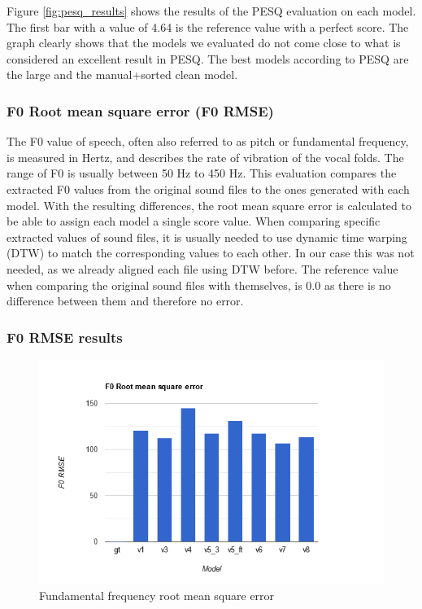 \documentclass[a4paper]{article}
\begin{document}
	Figure \ref{fig:pesq_results} shows the results of the PESQ evaluation on each
	model. The first bar with a value of 4.64 is the reference value with a perfect
	score. The graph clearly shows that the models we evaluated do not come close to
	what is considered an excellent result in PESQ. The best models according to
	PESQ are the large and the manual+sorted clean model.
	
	\subsubsection{F0 Root mean square error (F0 RMSE)}
	The F0 value of speech, often also referred to as pitch or fundamental
	frequency, is measured in Hertz, and describes the rate of vibration of the
	vocal folds. The range of F0 is usually between 50 Hz to 450 Hz. This evaluation
	compares the extracted F0 values from the original sound files to the ones
	generated with each model. With the resulting differences, the root mean square
	error is calculated to be able to assign each model a single score value. When
	comparing specific extracted values of sound files, it is usually needed to use
	dynamic time warping (DTW) to match the corresponding values to each other. In
	our case this was not needed, as we already aligned each file using DTW before.
	The reference value when comparing the original sound files with themselves, is
	0.0 as there is no difference between them and therefore no error.
	
	\subsubsection{F0 RMSE results}
	\begin{figure}[hbtp]
		\includegraphics[width=\textwidth]{evaluation/graphs/F0RMSE.png}
		\caption{Fundamental frequency root mean square error}
		\label{fig:f0rmse_results}
	\end{figure}
	
\end{document}
